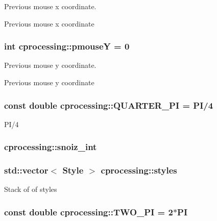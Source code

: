 \-Previous mouse x coordinate. 

\-Previous mouse x coordinate \hypertarget{namespacecprocessing_a51d209877748101ea857d64bc9b6ff2d}{
\subsubsection[{pmouse\-Y}]{\setlength{\rightskip}{0pt plus 5cm}int {\bf cprocessing\-::pmouse\-Y} = 0}}\label{namespacecprocessing_a51d209877748101ea857d64bc9b6ff2d}


\-Previous mouse y coordinate. 

\-Previous mouse y coordinate \hypertarget{namespacecprocessing_aa4fa2ff3538b68df8b95c6eba6c33a28}{
\subsubsection[{\-Q\-U\-A\-R\-T\-E\-R\-\_\-\-P\-I}]{\setlength{\rightskip}{0pt plus 5cm}const double {\bf cprocessing\-::\-Q\-U\-A\-R\-T\-E\-R\-\_\-\-P\-I} = {\bf \-P\-I}/4}}\label{namespacecprocessing_aa4fa2ff3538b68df8b95c6eba6c33a28}
\-P\-I/4 \hypertarget{namespacecprocessing_aab81f757257f375ea414cd3a49483e4c}{
\subsubsection[{snoiz\-\_\-int}]{ {\bf cprocessing\-::snoiz\-\_\-int}}}\label{namespacecprocessing_aab81f757257f375ea414cd3a49483e4c}
\hypertarget{namespacecprocessing_a58f7198a2386df8ea3559ea578069388}{
\subsubsection[{styles}]{\setlength{\rightskip}{0pt plus 5cm}std\-::vector$<$ {\bf \-Style} $>$ {\bf cprocessing\-::styles}}}\label{namespacecprocessing_a58f7198a2386df8ea3559ea578069388}
\-Stack of of styles \hypertarget{namespacecprocessing_aa9c16baaa88d39db100f54cb0bbca62f}{
\subsubsection[{\-T\-W\-O\-\_\-\-P\-I}]{\setlength{\rightskip}{0pt plus 5cm}const double {\bf cprocessing\-::\-T\-W\-O\-\_\-\-P\-I} = 2$\ast${\bf \-P\-I}}}\label{namespacecprocessing_aa9c16baaa88d39db100f54cb0bbca62f}
